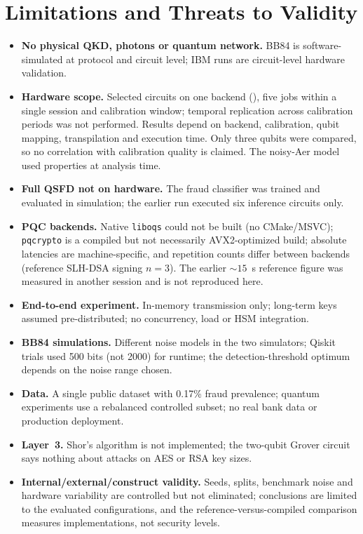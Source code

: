 \section{Limitations and Threats to Validity}\label{sec:limits}
\begin{itemize}
\item \textbf{No physical QKD, photons or quantum network.} BB84 is software-simulated at protocol and circuit level; IBM runs are circuit-level hardware validation.
\item \textbf{Hardware scope.} Selected circuits on one backend (\HwBackend{}), five jobs within a single session and calibration window; temporal replication across calibration periods was not performed. Results depend on backend, calibration, qubit mapping, transpilation and execution time. Only three qubits were compared, so no correlation with calibration quality is claimed. The noisy-Aer model used properties at analysis time.
\item \textbf{Full QSFD not on hardware.} The fraud classifier was trained and evaluated in simulation; the earlier  run executed six inference circuits only.
\item \textbf{PQC backends.} Native \texttt{liboqs} could not be built (no CMake/MSVC); \texttt{pqcrypto} is a compiled but not necessarily AVX2-optimized build; absolute latencies are machine-specific, and repetition counts differ between backends (reference SLH-DSA signing $n=3$). The earlier ${\sim}15$~s reference figure was measured in another session and is not reproduced here.
\item \textbf{End-to-end experiment.} In-memory transmission only; long-term keys assumed pre-distributed; no concurrency, load or HSM integration.
\item \textbf{BB84 simulations.} Different noise models in the two simulators; Qiskit trials used 500 bits (not 2000) for runtime; the detection-threshold optimum depends on the noise range chosen.
\item \textbf{Data.} A single public dataset with 0.17\% fraud prevalence; quantum experiments use a rebalanced controlled subset; no real bank data or production deployment.
\item \textbf{Layer~3.} Shor's algorithm is not implemented; the two-qubit Grover circuit says nothing about attacks on AES or RSA key sizes.
\item \textbf{Internal/external/construct validity.} Seeds, splits, benchmark noise and hardware variability are controlled but not eliminated; conclusions are limited to the evaluated configurations, and the reference-versus-compiled comparison measures implementations, not security levels.
\end{itemize}
